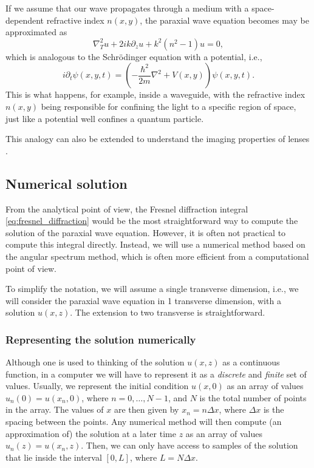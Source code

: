 \documentclass[openany,a4paper,oneside,11pt]{article}
\begin{document}
If we assume that our wave propagates through a medium with a space-dependent refractive index $n(x,y)$, the paraxial wave equation becomes may be approximated as
\begin{equation}
    \nabla^2_T u + 2ik \partial_z u + k^2(n^2 - 1) u = 0,
\end{equation}
which is analogous to the Schrödinger equation with a potential, i.e.,
\begin{equation}
    i \partial_t \psi(x, y, t) = \left( -\frac{\hbar^2}{2m} \nabla^2 + V(x,y) \right) \psi(x, y, t).
\end{equation}
This is what happens, for example, inside a waveguide, with the refractive index $n(x,y)$ being responsible for confining the light to a specific region of space, just like a potential well confines a quantum particle.

This analogy can also be extended to understand the imaging properties of lenses \cite{stoler1981operator}.

\subsection{Numerical solution}

From the analytical point of view, the Fresnel diffraction integral \eqref{eq:fresnel_diffraction} would be the most straightforward way to compute the solution of the paraxial wave equation. However, it is often not practical to compute this integral directly. Instead, we will use a numerical method based on the angular spectrum method, which is often more efficient from a computational point of view.

To simplify the notation, we will assume a single transverse dimension, i.e., we will consider the paraxial wave equation in 1 transverse dimension, with a solution $u(x,z)$. The extension to two transverse  is straightforward.

\subsubsection{Representing the solution numerically}

Although one is used to thinking of the solution $u(x,z)$ as a continuous function, in a computer we will have to represent it as a \textit{discrete} and \textit{finite} set of values. Usually, we represent the initial condition $u(x,0)$ as an array of values $u_n(0) = u(x_n, 0)$, where $n = 0, \ldots, N-1$, and $N$ is the total number of points in the array. The values of $x$ are then given by $x_n = n \Delta x$, where $\Delta x$ is the spacing between the points. Any numerical method will then compute (an approximation of) the solution at a later time $z$ as an array of values $u_n(z) = u(x_n, z)$. Then, we can only have access to samples of the solution that lie inside the interval $[0, L]$, where $L = N \Delta x$.
\end{document}

